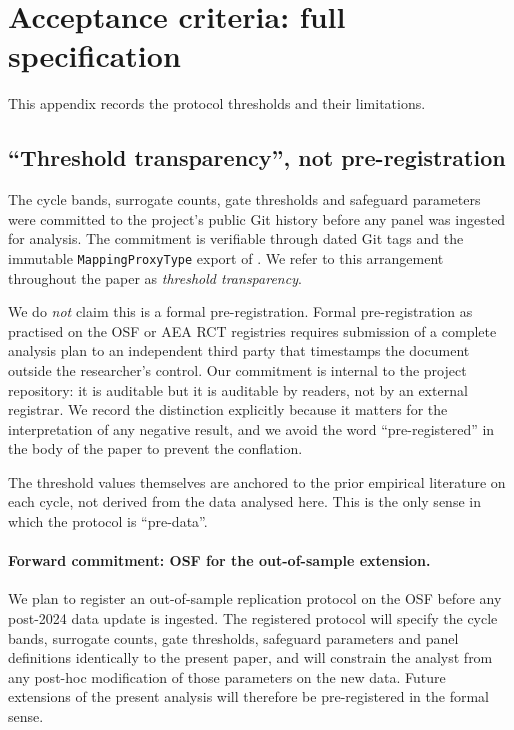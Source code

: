 \section{Acceptance criteria: full specification}
\label{app:criteria}

This appendix records the protocol thresholds and their
limitations.

\subsection{``Threshold transparency'', not pre-registration}

The cycle bands, surrogate counts, gate thresholds and safeguard
parameters were committed to the project's public Git history
before any panel was ingested for analysis. The commitment is
verifiable through dated Git tags and the immutable
\texttt{MappingProxyType} export of
. We refer to this
arrangement throughout the paper as \emph{threshold
transparency}.

We do \emph{not} claim this is a formal pre-registration. Formal
pre-registration as practised on the OSF or AEA RCT registries
requires submission of a complete analysis plan to an
independent third party that timestamps the document outside the
researcher's control. Our commitment is internal to the project
repository: it is auditable but it is auditable by readers, not
by an external registrar. We record the distinction explicitly
because it matters for the interpretation of any negative
result, and we avoid the word ``pre-registered'' in the body of
the paper to prevent the conflation.

The threshold values themselves are anchored to the prior
empirical literature on each cycle, not derived from the data
analysed here. This is the only sense in which the protocol is
``pre-data''.

\paragraph{Forward commitment: OSF for the out-of-sample
extension.}
We plan to register an out-of-sample replication protocol on
the OSF before any post-2024 data update is ingested. The
registered protocol will specify the cycle bands, surrogate
counts, gate thresholds, safeguard parameters and panel
definitions identically to the present paper, and will
constrain the analyst from any post-hoc modification of those
parameters on the new data. Future extensions of the present
analysis will therefore be pre-registered in the formal sense.

